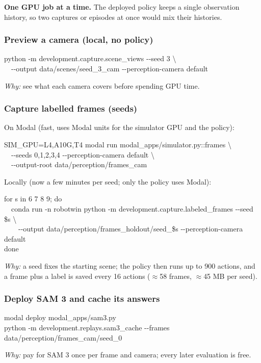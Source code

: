 \documentclass[11pt,a4paper]{article}
\begin{document}
\begin{careful}
\textbf{One GPU job at a time.} The deployed policy keeps a single observation history,
so two captures or episodes at once would mix their histories.
\end{careful}

\subsubsection*{Preview a camera (local, no policy)}
\begin{cmd}
python -m development.capture.scene\_views -{}-seed 3 \textbackslash\\
\ \ -{}-output data/scenes/seed\_3\_cam -{}-perception-camera default
\end{cmd}
\emph{Why:} see what each camera covers before spending GPU time.

\subsubsection*{Capture labelled frames (seeds)}
On Modal (fast, uses Modal units for the simulator GPU and the policy):
\begin{cmd}
SIM\_GPU=L4,A10G,T4 modal run modal\_apps/simulator.py::frames \textbackslash\\
\ \ -{}-seeds 0,1,2,3,4 -{}-perception-camera default \textbackslash\\
\ \ -{}-output-root data/perception/frames\_cam
\end{cmd}
Locally (now a few minutes per seed; only the policy uses Modal):
\begin{cmd}
for s in 6 7 8 9; do\\
\ \ conda run -n robotwin python -m development.capture.labeled\_frames -{}-seed \$s \textbackslash\\
\ \ \ \ -{}-output data/perception/frames\_holdout/seed\_\$s -{}-perception-camera default\\
done
\end{cmd}
\emph{Why:} a seed fixes the starting scene; the policy then runs up to 900 actions, and a
frame plus a label is saved every 16 actions ($\approx$58 frames, $\approx$45 MB per seed).

\subsubsection*{Deploy SAM 3 and cache its answers}
\begin{cmd}
modal deploy modal\_apps/sam3.py\\
python -m development.replays.sam3\_cache -{}-frames data/perception/frames\_cam/seed\_0
\end{cmd}
\emph{Why:} pay for SAM 3 once per frame and camera; every later evaluation is free.
\end{document}
